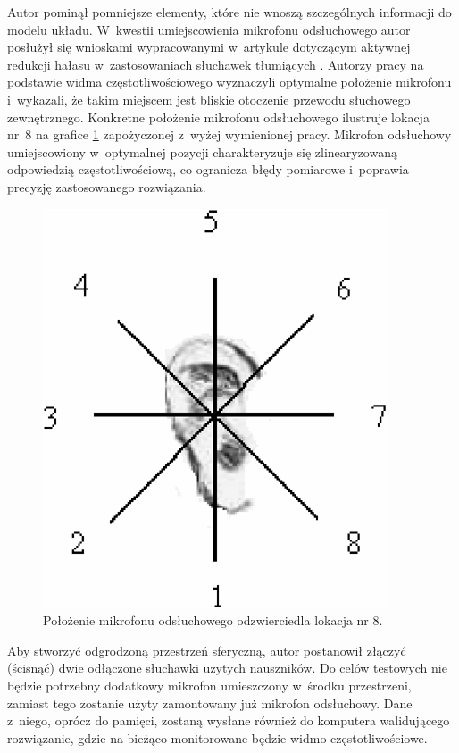 Autor pominął pomniejsze elementy, które nie wnoszą szczególnych informacji do modelu układu. W~kwestii umiejscowienia mikrofonu odsłuchowego autor posłużył się wnioskami wypracowanymi w~artykule dotyczącym aktywnej redukcji hałasu w~zastosowaniach słuchawek tłumiących \cite{ANC4HP}. Autorzy pracy na podstawie widma częstotliwościowego wyznaczyli optymalne położenie mikrofonu i~wykazali, że takim miejscem jest bliskie otoczenie przewodu słuchowego zewnętrznego. Konkretne położenie mikrofonu odsłuchowego ilustruje lokacja nr~8 na grafice \ref{fig:error_mic_placement} zapożyczonej z~wyżej wymienionej pracy. %
Mikrofon odsłuchowy umiejscowiony w~optymalnej pozycji charakteryzuje się zlinearyzowaną odpowiedzią częstotliwościową, co ogranicza błędy pomiarowe i~poprawia precyzję zastosowanego rozwiązania. 
\begin{figure}
	\centering
	\includegraphics[scale=0.75]{../Assets/error_mic_placement.png}
	\caption{Położenie mikrofonu odsłuchowego odzwierciedla lokacja nr 8.}
	\label{fig:error_mic_placement}
\end{figure}
Aby stworzyć odgrodzoną przestrzeń sferyczną, autor postanowił złączyć (ścisnąć) dwie odłączone słuchawki użytych nauszników. Do celów testowych nie będzie potrzebny dodatkowy mikrofon umieszczony w~środku przestrzeni, zamiast tego zostanie użyty zamontowany już mikrofon odsłuchowy. Dane z~niego, oprócz do pamięci, zostaną wysłane również do komputera walidującego rozwiązanie, gdzie na bieżąco monitorowane będzie widmo częstotliwościowe.

